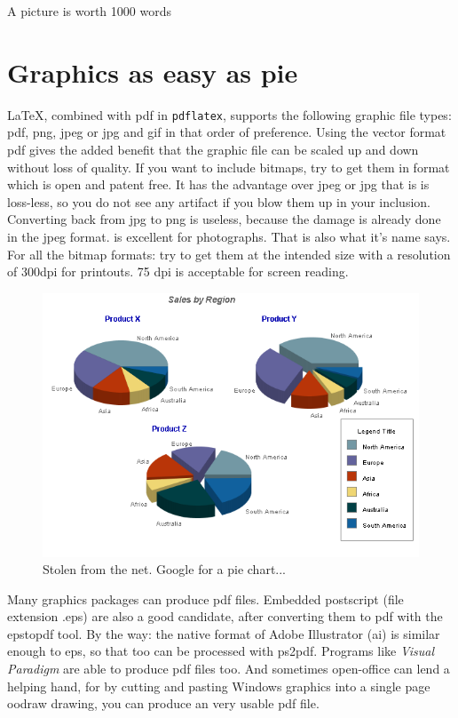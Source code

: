 \renewcommand\TheFile{ch04_graphics.tex}

\begin{savequote}[15cm]
  \vspace{-30mm}
  \raggedleft
  \sffamily
A picture is worth 1000 words
\end{savequote}
\chapter{Graphics as easy as pie}
\LaTeX, combined with pdf in \texttt{pdflatex}, supports the following
graphic file types: pdf, png, jpeg or jpg and gif in that order of
preference. Using the vector format pdf gives the added benefit that
the graphic file can be scaled up and down without loss of quality.
If you want to include bitmaps, try to get them in  format which
is open and patent free. It has the advantage over jpeg or jpg that is is
loss-less, so you do not see any artifact if you blow them up in your
inclusion. Converting back from jpg to png is useless, because the
damage is already done in the jpeg format.  is excellent for
photographs. That is also what it's name says. For all the bitmap formats: try to get them at the
intended size with a resolution of 300dpi for printouts. 75 dpi is
acceptable for screen reading.
  
\begin{figure}[thbp]
  \centering
  \includegraphics[width=.8\textwidth]{images/servlet3.png}
  \caption[A Pie chart]{Stolen from the net. Google for a pie chart...}
  \label{fig:pie}
\end{figure}

Many graphics packages can produce pdf files.
Embedded postscript (file extension .eps) are also a good candidate,
after converting them to pdf with the epstopdf tool. By the way: the
native format of Adobe Illustrator (ai) is similar enough to eps, so
that too can be processed with ps2pdf. Programs like {\em Visual
  Paradigm} are able to produce pdf files too. And sometimes open-office can
lend a helping hand, for by cutting and pasting Windows graphics into
a single page oodraw drawing, you can produce an very usable pdf file. 

